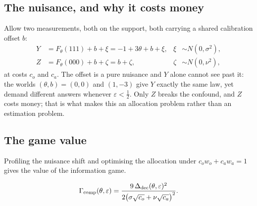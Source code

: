 \subsection{The nuisance, and why it costs money}

Allow two measurements, both on the support, both carrying a shared calibration offset $b$:
\begin{equation}
\begin{aligned}
Y&=F_{\theta}(111)+b+\xi=-1+3\theta+b+\xi, &\xi&\sim N(0,\sigma^{2}),\\
Z&=F_{\theta}(000)+b+\zeta=b+\zeta, &\zeta&\sim N(0,\nu^{2}),
\end{aligned}
\label{eq:measurements}
\end{equation}
at costs $c_{o}$ and $c_{a}$. The offset is a pure nuisance and $Y$ alone cannot see past
it: the worlds $(\theta,b)=(0,0)$ and $(1,-3)$ give $Y$ exactly the same law, yet demand
different answers whenever $\varepsilon<\tfrac12$. Only $Z$ breaks the confound, and $Z$
costs money; that is what makes this an allocation problem rather than an estimation
problem.


\subsection{The game value}

Profiling the nuisance shift and optimising the allocation under
$c_{o}w_{o}+c_{a}w_{a}=1$ gives the value of the information game.

\begin{theorem}
\label{thm:gamma}
\begin{equation}
\Gamma_{\rm comp}(\theta,\varepsilon)
=\frac{9\,\Delta_{\rm dec}(\theta,\varepsilon)^{2}}
{2\bigl(\sigma\sqrt{c_{o}}+\nu\sqrt{c_{a}}\bigr)^{2}} .
\label{eq:gamma}
\end{equation}
\end{theorem}


